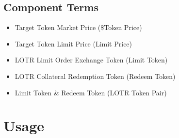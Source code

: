 \documentclass[12pt]{article}
\begin{document}
      \subsection*{Component Terms}
         \begin{itemize}{}{}
            \item Target Token Market Price (\$Token Price)
            \item Target Token Limit Price (Limit Price)
            \item LOTR Limit Order Exchange Token (Limit Token)
            \item LOTR Collateral Redemption Token (Redeem Token)
            \item Limit Token \& Redeem Token (LOTR Token Pair)
         \end{itemize}

   \section{Usage}
\end{document}
